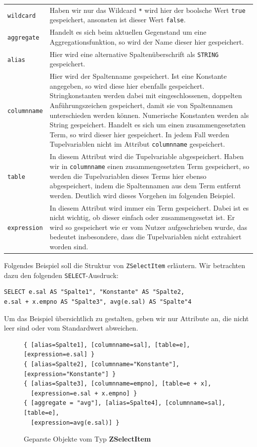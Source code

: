 \begin{tabular}{lp{}}
\verb|wildcard| & Haben wir nur das Wildcard \verb|*| wird hier der boolsche Wert \verb|true| gespeichert, ansonsten ist dieser Wert \verb|false|.\\
\verb|aggregate| & Handelt es sich beim aktuellen Gegenstand um eine Aggregationsfunktion, so wird der Name dieser hier gespeichert.\\
\verb|alias| & Hier wird eine alternative Spaltenüberschrift als \verb|STRING| gespeichert.\\
\verb|columnname| & Hier wird der Spaltenname gespeichert. Ist eine Konstante angegeben, so wird diese hier ebenfalls gespeichert. Stringkonstanten werden dabei mit eingeschlossenen, doppelten Anführungszeichen gespeichert, damit sie von Spaltennamen unterschieden werden können. Numerische Konstanten werden als String gespeichert. Handelt es sich um einen zusammengesetzten Term, so wird dieser hier gespeichert. In jedem Fall werden Tupelvariablen nicht im Attribut \verb|columnname| gespeichert.\\
\verb|table| & In diesem Attribut wird die Tupelvariable abgespeichert. Haben wir in \verb|columnname| einen zusammengesetzten Term gespeichert, so werden die Tupelvariablen dieses Terms hier ebenso abgespeichert, indem die Spaltennamen aus dem Term entfernt werden. Deutlich wird dieses Vorgehen im folgenden Beispiel.\\
\verb|expression| & In diesem Attribut wird immer ein Term gespeichert. Dabei ist es nicht wichtig, ob dieser einfach oder zusammengesetzt ist. Er wird so gespeichert wie er vom Nutzer aufgeschrieben wurde, das bedeutet insbesondere, dass die Tupelvariablen nicht extrahiert worden sind.\\
\end{tabular}

Folgendes Beispiel soll die Struktur von \verb|ZSelectItem| erläutern. Wir betrachten dazu den folgenden \verb|SELECT|-Ausdruck: \begin{verbatim}SELECT e.sal AS "Spalte1", "Konstante" AS "Spalte2, 
e.sal + x.empno AS "Spalte3", avg(e.sal) AS "Spalte"4\end{verbatim} Um das Beispiel übersichtlich zu gestalten, geben wir nur Attribute an, die nicht leer sind oder vom Standardwert abweichen.

\begin{figure}[h]
\begin{verbatim}
{ [alias=Spalte1], [columnname=sal], [table=e], [expression=e.sal] }
{ [alias=Spalte2], [columnname="Konstante"], [expression="Konstante"] }
{ [alias=Spalte3], [columnname=empno], [table=e + x], 
  [expression=e.sal + x.empno] }
{ [aggregate = "avg"], [alias=Spalte4], [columnname=sal], [table=e], 
  [expression=avg(e.sal)] }
\end{verbatim}
\caption{Geparste Objekte vom Typ \textbf{ZSelectItem}}
\end{figure}

